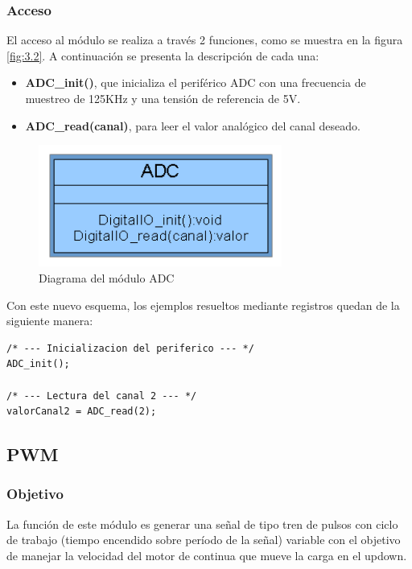 \subsubsection{Acceso}

El acceso al módulo se realiza a través 2 funciones, como se muestra en la figura \ref{fig:3.2}. A continuación se presenta la descripción de cada una:
\begin{itemize}
	\item \textbf{ADC\_init()}, que inicializa el periférico ADC con una frecuencia de muestreo de 125KHz y una tensión de referencia de 5V.
	\item \textbf{ADC\_read(canal)}, para leer el valor analógico del canal deseado.
\end{itemize}

\begin{figure}[!ht]
	\centering
	\includegraphics[width=8cm,scale=1]{resources/3_2-moduloADC.png}
	\caption{Diagrama del módulo ADC}
	\label{fig:\thefigure}
\end{figure}

Con este nuevo esquema, los ejemplos resueltos mediante registros quedan de la siguiente manera:

\begin{lstlisting}[style=CStyle]
/* --- Inicializacion del periferico --- */
ADC_init(); 

/* --- Lectura del canal 2 --- */
valorCanal2 = ADC_read(2);
\end{lstlisting}



\subsection{PWM}
\subsubsection{Objetivo}
La función de este módulo es generar una señal de tipo tren de pulsos con ciclo de trabajo (tiempo encendido sobre período de la señal) variable con el objetivo de manejar la velocidad del motor de continua que mueve la carga en el updown.

